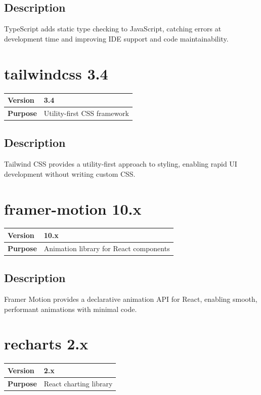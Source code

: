 \documentclass[12pt,a4paper]{report}
\begin{document}
\subsection{Description}

TypeScript adds static type checking to JavaScript, catching errors at development time and improving IDE support and code maintainability.

\section{tailwindcss 3.4}

\begin{tabular}{|p{4cm}|p{10cm}|}
\hline
\textbf{Version} & 3.4 \\
\hline
\textbf{Purpose} & Utility-first CSS framework \\
\hline
\end{tabular}

\subsection{Description}

Tailwind CSS provides a utility-first approach to styling, enabling rapid UI development without writing custom CSS.

\section{framer-motion 10.x}

\begin{tabular}{|p{4cm}|p{10cm}|}
\hline
\textbf{Version} & 10.x \\
\hline
\textbf{Purpose} & Animation library for React components \\
\hline
\end{tabular}

\subsection{Description}

Framer Motion provides a declarative animation API for React, enabling smooth, performant animations with minimal code.

\section{recharts 2.x}

\begin{tabular}{|p{4cm}|p{10cm}|}
\hline
\textbf{Version} & 2.x \\
\hline
\textbf{Purpose} & React charting library \\
\hline
\end{tabular}
\end{document}
